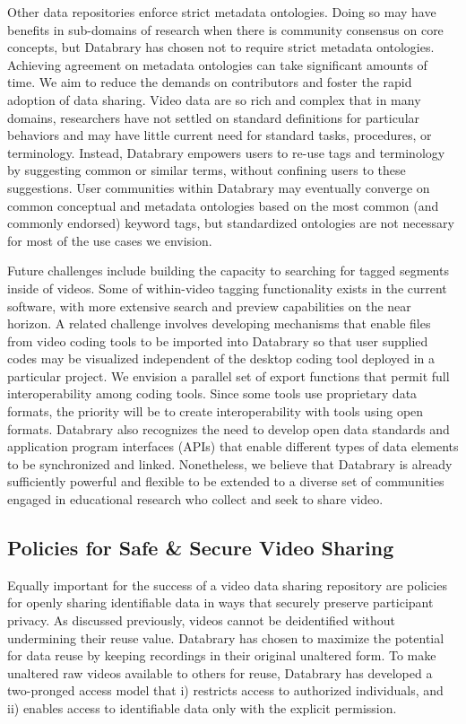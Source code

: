 \documentclass[letterpaper,man,apacite]{apa6}
\begin{document}
Other data repositories enforce strict metadata ontologies.
Doing so may have benefits in sub-domains of research when there is community consensus on core concepts, but Databrary has chosen not to require strict metadata ontologies. 
Achieving agreement on metadata ontologies can take significant amounts of time. 
We aim to reduce the demands on contributors and foster the rapid adoption of data sharing.
Video data are so rich and complex that in many domains, researchers have not settled on standard definitions for particular behaviors and may have little current need for standard tasks, procedures, or terminology. 
Instead, Databrary empowers users to re-use tags and terminology by suggesting common or similar terms, without confining users to these suggestions. 
User communities within Databrary may eventually converge on common conceptual and metadata ontologies based on the most common (and commonly endorsed) keyword tags, but standardized ontologies are not necessary for most of the use cases we envision.

Future challenges include building the capacity to searching for tagged segments inside of videos.
Some of within-video tagging functionality exists in the current software, with more extensive search and preview capabilities on the near horizon.
A related challenge involves developing mechanisms that enable files from video coding tools to be imported into Databrary so that user supplied codes may be visualized independent of the desktop coding tool deployed in a particular project.
We envision a parallel set of export functions that permit full interoperability among coding tools.
Since some tools use proprietary data formats, the priority will be to create interoperability with tools using open formats.
Databrary also recognizes the need to develop open data standards and application program interfaces (APIs) that enable different types of data elements to be synchronized and linked.
Nonetheless, we believe that Databrary is already sufficiently powerful and flexible to be extended to a diverse set of communities engaged in educational research who collect and seek to share video.

\subsection{Policies for Safe \& Secure Video Sharing}

Equally important for the success of a video data sharing repository are policies for openly sharing identifiable data in ways that securely preserve participant privacy.
As discussed previously, videos cannot be deidentified without undermining their reuse value.
Databrary has chosen to maximize the potential for data reuse by keeping recordings in their original
unaltered form.
To make unaltered raw videos available to others for reuse, Databrary has developed a two-pronged access model that i) restricts access to authorized individuals, and ii) enables access to identifiable data only with the explicit permission.
\end{document}
